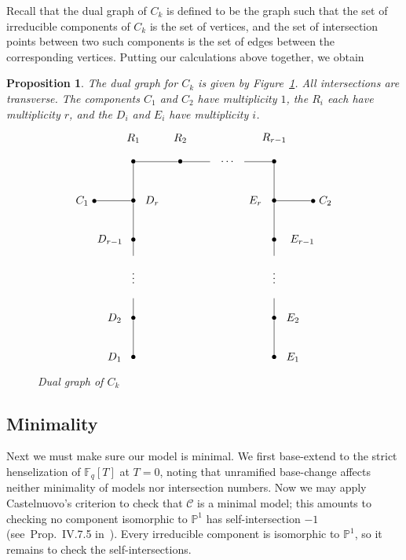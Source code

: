 \documentclass[reqno]{amsart}
\newtheorem{proposition}[thm]{Proposition}
\theoremstyle{definition}
\theoremstyle{remark}
\def\F{\mathbb{F}}
\def\scd{\mathscr{C}}
\def\Pro{\ensuremath{\mathbb{P}}}
\begin{document}
Recall that the dual graph of $C_k$ is defined to be the graph such that the set of irreducible components of $C_k$ is the set of vertices, and the set of intersection points between two such components is the set of edges between the corresponding vertices. Putting our calculations above together, we obtain
\begin{proposition}\label{prop:dual-graph-plus-multiplicities}
  The dual graph for $C_k$ is given by Figure~\ref{fig:superelliptic-dual-graph}. All intersections are transverse. The components $C_1$ and $C_2$ have multiplicity $1$, the $R_i$ each have multiplicity $r$, and the $D_i$ and $E_i$ have multiplicity $i$.
\begin{figure}[h]\centering
\[
\xygraph{
  !{<0cm,0cm>;<1.5cm,0cm>:<0cm,1.25cm>::}
  !{(1,5) }*{\bullet}="r1"
  !{(2,5) }*{\bullet}="r2"
  !{(3,5) }*{\quad\cdots\quad}="rspace"
  !{(4,5) }*{\bullet}="rrm"
  !{(1,5.6) }*{R_1}
  !{(2,5.6) }*{R_2}
  !{(4,5.6) }*{R_{r-1}}
  !{(0,4) }*{C_1\;\bullet}="c1"
  !{(5,4) }*{\bullet\; C_2}="c2"
  !{(1,0) }*{\bullet}="d1"
  !{(1,1) }*{\bullet}="d2"
  !{(1,1.5) }*{}="dbelow"
  !{(1,2.1) }*{\vdots}="dspace"
  !{(1,2.6) }*{}="dabove"
  !{(1,3) }*{\bullet}="drm"
  !{(1,4) }*{\bullet}="dr"
  !{(.6,0) }*{D_1}
  !{(.6,1) }*{D_2}
  !{(.5,3) }*{D_{r-1}}
  !{(1.4,4) }*{D_r}
  !{(4,0) }*{\bullet}="e1"
  !{(4,1) }*{\bullet}="e2"
  !{(4,1.5) }*{}="ebelow"
  !{(4,2.1) }*{\vdots}="espace"
  !{(4,2.6) }*{}="eabove"
  !{(4,3) }*{\bullet}="erm"
  !{(4,4) }*{\bullet}="er"
  !{(4.4,0) }*{E_1}
  !{(4.4,1) }*{E_2}
  !{(4.6,3) }*{E_{r-1}}
  !{(3.6,4) }*{E_r}
  "r1"-"r2"
  "r2"-"rspace"
  "rspace"-"rrm"
  "r1"-"dr"
  "c1"-"dr"
  "dr"-"drm"
  "drm"-"dabove"
  "dbelow"-"d2"
  "d2"-"d1"
  "rrm"-"er"
  "c2"-"er"
  "er"-"erm"
  "erm"-"eabove"
  "ebelow"-"e2"
  "e2"-"e1"
}
\]


\caption{Dual graph of $C_k$}
\label{fig:superelliptic-dual-graph}
\end{figure}
\end{proposition}


\subsection{Minimality}
\label{sec:minimality}

Next we must make sure our model is minimal. We first base-extend to the strict henselization of $\F_q[T]$ at $T = 0$, noting that unramified base-change affects neither minimality of models nor intersection numbers. Now we may apply Castelnuovo's criterion to check that $\scd$ is a minimal model; this amounts to checking no component isomorphic to $\Pro^1$ has self-intersection $-1$ (see~Prop.~IV.7.5 in~\cite{silvermanATAEC}). Every irreducible component is isomorphic to $\Pro^1$, so it remains to check the self-intersections. 
\end{document}
